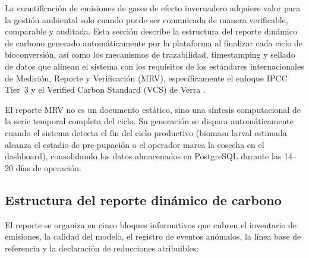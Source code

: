 La cuantificación de emisiones de gases de efecto invernadero adquiere valor para la gestión ambiental solo cuando puede ser comunicada de manera verificable, comparable y auditada. Esta sección describe la estructura del reporte dinámico de carbono generado automáticamente por la plataforma al finalizar cada ciclo de bioconversión, así como los mecanismos de trazabilidad, timestamping y sellado de datos que alinean el sistema con los requisitos de los estándares internacionales de Medición, Reporte y Verificación (MRV), específicamente el enfoque IPCC Tier~3 y el Verified Carbon Standard (VCS) de Verra \parencite{verraVCSStandardV472024}.

El reporte MRV no es un documento estático, sino una síntesis computacional de la serie temporal completa del ciclo. Su generación se dispara automáticamente cuando el sistema detecta el fin del ciclo productivo (biomasa larval estimada alcanza el estadio de pre-pupación o el operador marca la cosecha en el dashboard), consolidando los datos almacenados en PostgreSQL durante las \num{14}--\num{20} días de operación.

\subsection{Estructura del reporte dinámico de carbono}
\label{subsec:cap5_estructura_reporte}

El reporte se organiza en cinco bloques informativos que cubren el inventario de emisiones, la calidad del modelo, el registro de eventos anómalos, la línea base de referencia y la declaración de reducciones atribuibles:

